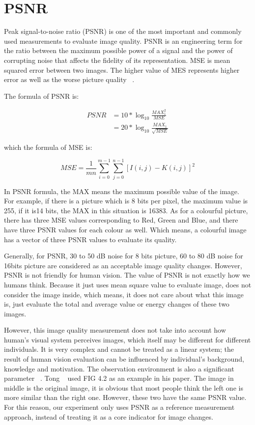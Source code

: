 \section{\label{sec:level1}PSNR}

Peak signal-to-noise ratio (PSNR) is one of the most  important and commonly used measurements to evaluate image quality. PSNR is an engineering term for the ratio between the maximum possible power of a signal and the power of corrupting noise that affects the fidelity of its representation. MSE is mean squared error between two images. The higher value of MES represents higher error as well as the worse picture quality ~\cite{eratne2009fast}.

The formula of PSNR is:

\begin{align*}  
PSNR    &=  10* \log_{10} \frac{MAX^2_{1}}{MSE} \\
        &=  20 *\log_{10} \frac{MAX_{1}}{\sqrt{MSE}}
\end{align*} 

which the formula of MSE is:

$$MSE = \frac{1}{mn}\sum_{i=0}^{m-1}\sum_{j=0}^{n-1} [I(i,j)-K(i,j)]^2$$

In PSNR formula, the MAX means the maximum possible value of the image. For example, if there is a picture which is 8 bits per pixel, the maximum value is 255, if it is14 bits, the MAX in this situation is 16383. As for a colourful picture, there has three MSE values corresponding to Red, Green and Blue, and there have three PSNR values for each colour as well. Which means, a colourful image has a vector of three PSNR values to evaluate its quality.


Generally, for PSNR, 30 to 50 dB noise for 8 bits picture, 60 to 80 dB noise for 16bits picture are considered as an acceptable image quality changes. However, PSNR is not friendly for human vision. The value of PSNR is not exactly how we humans think. Because it just uses mean square value to evaluate image, does not consider the image inside, which means, it does not care about what this image is, just evaluate the total and average value or energy changes of these two images.

However, this image quality measurement does not take into account how human's visual system perceives images, which itself may be different for different individuals. It is very complex and cannot be treated as a linear system; the result of human vision evaluation can be influenced by individual’s background, knowledge and motivation. The observation environment is also a significant parameter ~\cite{Tong2006IamgeQuality}. Tong ~\cite{Tong2006IamgeQuality} used FIG 4.2 as an example in his paper. The image in middle is the original image, it is obvious that most people think the left one is more similar than the right one. However, these two have the same PSNR value. For this reason, our experiment only uses PSNR as a reference measurement approach, instead of treating it as a core indicator for image changes.

